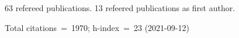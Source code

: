 63 refereed publications. 13 refeered publications as first author.

Total citations~=~1970; h-index~=~23 (2021-09-12)